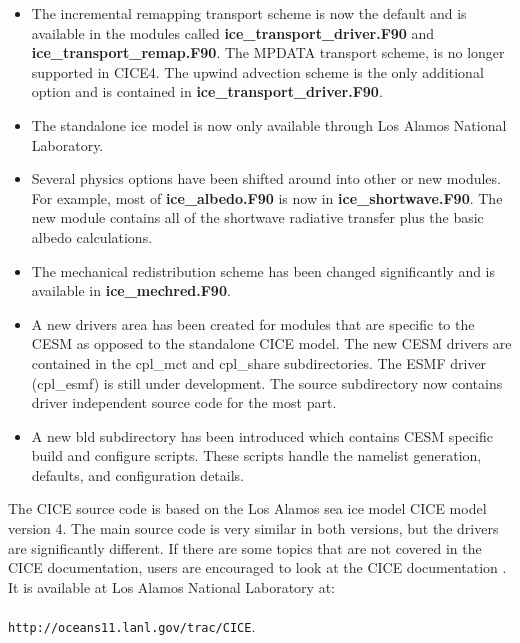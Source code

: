 \begin{itemize}

\item The incremental remapping transport scheme is now the default and is
      available in the modules called {\bf ice\_transport\_driver.F90} and 
      {\bf ice\_transport\_remap.F90}.  The MPDATA transport scheme,
      is no longer supported in CICE4. The upwind advection scheme is the
      only additional option and is contained in 
      {\bf ice\_transport\_driver.F90}.

\item The standalone ice model is now only available through Los Alamos National
      Laboratory.

\item Several physics options have been shifted around into other or new
      modules. For example, most of {\bf ice\_albedo.F90} is now in 
      {\bf ice\_shortwave.F90}. The new module contains all of the shortwave
      radiative transfer plus the basic albedo calculations.

\item The mechanical redistribution scheme has been changed significantly and
      is available in {\bf ice\_mechred.F90}.

\item A new drivers area has been created for modules that are specific
      to the CESM as opposed to the standalone CICE model. The new CESM
      drivers are contained in the cpl\_mct and cpl\_share subdirectories.
      The ESMF driver (cpl\_esmf) is still under development. The source
      subdirectory now contains driver independent source code for the
      most part.

\item A new bld subdirectory has been introduced which contains CESM
      specific build and configure scripts. These scripts handle the
      namelist generation, defaults, and configuration details.

\end{itemize}

The CICE source code is based on the Los Alamos sea ice model CICE model version 4.  The main source code is very similar in both versions, but the drivers are significantly different.  If there are some topics that are not covered in the CICE documentation, users are encouraged to look at the CICE documentation \cite{cice08}.  It is available at Los Alamos National Laboratory at: \\
\\

                    {\tt http://oceans11.lanl.gov/trac/CICE}.\\
